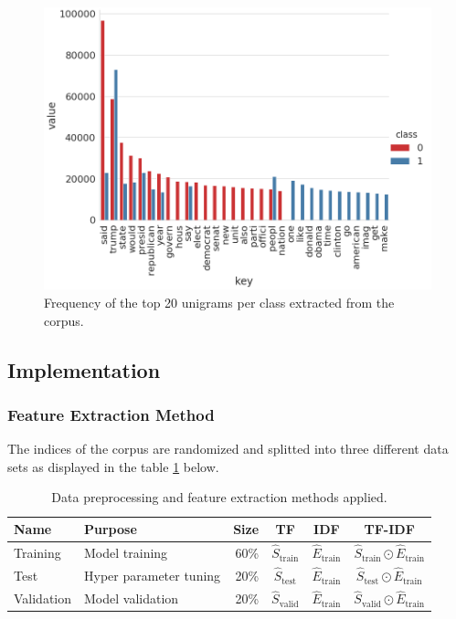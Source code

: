 \documentclass[a4paper,12pt,nottoc]{article}
\begin{document}
\begin{figure}[h]
\includegraphics[width=14cm]{../2_project/output/word_analysis_1.png}
\centering
\caption{Frequency of the top 20 unigrams per class extracted from the corpus.}\label{fig:top20}
\end{figure}

\subsection{Implementation}

\subsubsection{Feature Extraction Method}

The indices of the corpus are randomized and splitted into three different data sets as displayed in the table \ref{tab:datapreproc} below.

\begin{table}[h]
\begin{center}
\begin{tabular}{| l | l | r | c | c | c |}
\hline
Name & Purpose & Size & TF & IDF & TF-IDF \\
\hline
Training & Model training & 60\% & $\hat{S}_{\textrm{train}}$ & $\hat{E}_{\textrm{train}}$ & $\hat{S}_{\textrm{train}} \odot \hat{E}_{\textrm{train}}$ \\  
Test & Hyper parameter tuning & 20\% & $\hat{S}_{\textrm{test}}$ & $\hat{E}_{\textrm{train}}$ & $\hat{S}_{\textrm{test}} \odot \hat{E}_{\textrm{train}}$ \\    
Validation & Model validation & 20\% & $\hat{S}_{\textrm{valid}}$ & $\hat{E}_{\textrm{train}}$ & $\hat{S}_{\textrm{valid}} \odot \hat{E}_{\textrm{train}}$ \\
\hline 
\end{tabular}
\end{center}
\caption{Data preprocessing and feature extraction methods applied.}\label{tab:datapreproc}
\end{table}
\end{document}
